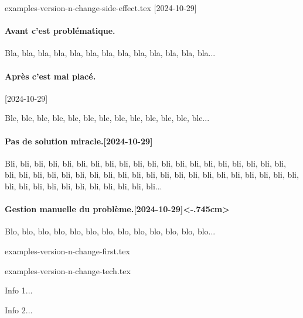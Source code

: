 \begin{filecontents*}[overwrite]{examples-version-n-change-side-effect.tex}
[2024-10-29]%
\paragraph{Avant c'est problématique.}
Bla, bla, bla, bla, bla, bla, bla, bla, bla, bla, bla, bla, bla...


\paragraph{Après c'est mal placé.}%
[2024-10-29]

Ble, ble, ble, ble, ble, ble, ble, ble, ble, ble, ble, ble, ble...


\paragraph{Pas de solution miracle.[2024-10-29]}

Bli, bli, bli, bli, bli, bli, bli, bli, bli, bli, bli, bli, bli,
bli, bli, bli, bli, bli, bli, bli, bli, bli, bli, bli, bli, bli,
bli, bli, bli, bli, bli, bli, bli, bli, bli, bli, bli, bli, bli,
bli, bli, bli, bli, bli, bli, bli, bli, bli, bli, bli, bli, bli...


\paragraph{Gestion manuelle du problème.[2024-10-29]<-.745cm>}

Blo, blo, blo, blo, blo, blo, blo, blo, blo, blo, blo, blo, blo...
\end{filecontents*}


\begin{filecontents*}[overwrite]{examples-version-n-change-first.tex}
\end{filecontents*}


\begin{filecontents*}[overwrite]{examples-version-n-change-tech.tex}
\begin{tdoctech}
    \item Info 1...
    \item Info 2...
\end{tdoctech}
\end{filecontents*}


